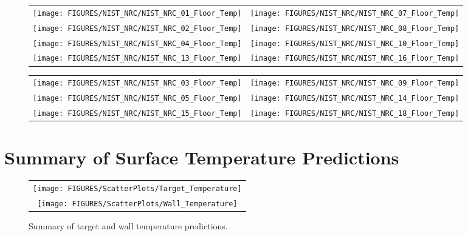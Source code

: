 \begin{figure}[p]
\begin{tabular*}{\textwidth}{l@{\extracolsep{\fill}}r}
\texttt{[image: FIGURES/NIST\_NRC/NIST\_NRC\_01\_Floor\_Temp]} &
\texttt{[image: FIGURES/NIST\_NRC/NIST\_NRC\_07\_Floor\_Temp]} \\
\texttt{[image: FIGURES/NIST\_NRC/NIST\_NRC\_02\_Floor\_Temp]} &
\texttt{[image: FIGURES/NIST\_NRC/NIST\_NRC\_08\_Floor\_Temp]} \\
\texttt{[image: FIGURES/NIST\_NRC/NIST\_NRC\_04\_Floor\_Temp]} &
\texttt{[image: FIGURES/NIST\_NRC/NIST\_NRC\_10\_Floor\_Temp]} \\
\texttt{[image: FIGURES/NIST\_NRC/NIST\_NRC\_13\_Floor\_Temp]} &
\texttt{[image: FIGURES/NIST\_NRC/NIST\_NRC\_16\_Floor\_Temp]}
\end{tabular*}
\label{NIST_NRC_Floor_Temp_Closed}
\end{figure}

\begin{figure}[p]
\begin{tabular*}{\textwidth}{l@{\extracolsep{\fill}}r}
\texttt{[image: FIGURES/NIST\_NRC/NIST\_NRC\_03\_Floor\_Temp]} &
\texttt{[image: FIGURES/NIST\_NRC/NIST\_NRC\_09\_Floor\_Temp]} \\
\texttt{[image: FIGURES/NIST\_NRC/NIST\_NRC\_05\_Floor\_Temp]} &
\texttt{[image: FIGURES/NIST\_NRC/NIST\_NRC\_14\_Floor\_Temp]} \\
\texttt{[image: FIGURES/NIST\_NRC/NIST\_NRC\_15\_Floor\_Temp]} &
\texttt{[image: FIGURES/NIST\_NRC/NIST\_NRC\_18\_Floor\_Temp]}
\end{tabular*}
\label{NIST_NRC_Floor_Temp_Open}
\end{figure}

\clearpage


\section{Summary of Surface Temperature Predictions}


\begin{figure}[h!]
\begin{center}
\begin{tabular}{c}
\texttt{[image: FIGURES/ScatterPlots/Target\_Temperature]} \\
\texttt{[image: FIGURES/ScatterPlots/Wall\_Temperature]}
\end{tabular}
\end{center}
\caption[Summary of target and wall temperature predictions]
{Summary of target and wall temperature predictions.}
\end{figure}
